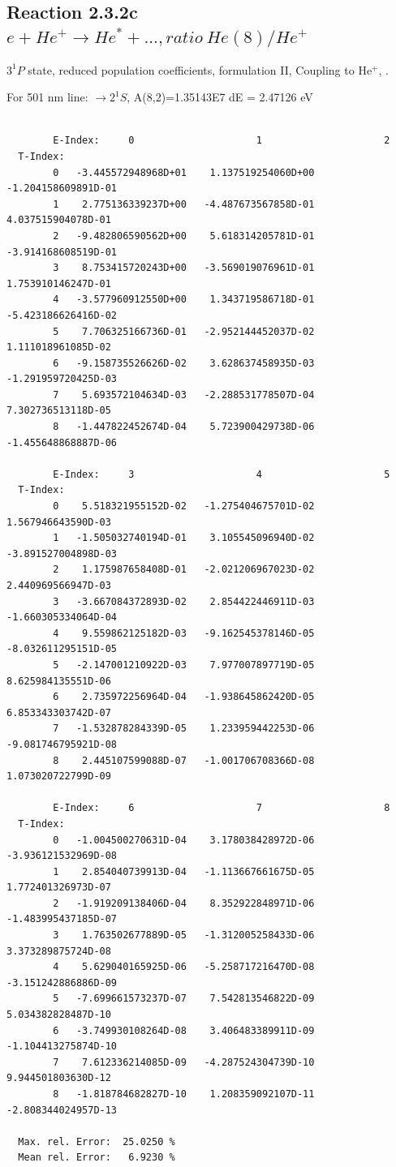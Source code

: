 \documentclass[12pt,dvips]{article}
\begin{document}
\subsection{
  Reaction 2.3.2c $e + He^+ \rightarrow He^* + ...,  ratio ~ He(8)/He^+$
}

  $3^1P$ state,
  reduced population coefficients, formulation II,
  Coupling to He$^+$, \cite{kn:Fujimoto}.

  For 501 nm line: $\rightarrow 2^1S$, A(8,2)=1.35143E7 dE = 2.47126 eV

\begin{small}\begin{verbatim}

        E-Index:     0                     1                     2
  T-Index:
        0   -3.445572948968D+01    1.137519254060D+00   -1.204158609891D-01
        1    2.775136339237D+00   -4.487673567858D-01    4.037515904078D-01
        2   -9.482806590562D+00    5.618314205781D-01   -3.914168608519D-01
        3    8.753415720243D+00   -3.569019076961D-01    1.753910146247D-01
        4   -3.577960912550D+00    1.343719586718D-01   -5.423186626416D-02
        5    7.706325166736D-01   -2.952144452037D-02    1.111018961085D-02
        6   -9.158735526626D-02    3.628637458935D-03   -1.291959720425D-03
        7    5.693572104634D-03   -2.288531778507D-04    7.302736513118D-05
        8   -1.447822452674D-04    5.723900429738D-06   -1.455648868887D-06

        E-Index:     3                     4                     5
  T-Index:
        0    5.518321955152D-02   -1.275404675701D-02    1.567946643590D-03
        1   -1.505032740194D-01    3.105545096940D-02   -3.891527004898D-03
        2    1.175987658408D-01   -2.021206967023D-02    2.440969566947D-03
        3   -3.667084372893D-02    2.854422446911D-03   -1.660305334064D-04
        4    9.559862125182D-03   -9.162545378146D-05   -8.032611295151D-05
        5   -2.147001210922D-03    7.977007897719D-05    8.625984135551D-06
        6    2.735972256964D-04   -1.938645862420D-05    6.853343303742D-07
        7   -1.532878284339D-05    1.233959442253D-06   -9.081746795921D-08
        8    2.445107599088D-07   -1.001706708366D-08    1.073020722799D-09

        E-Index:     6                     7                     8
  T-Index:
        0   -1.004500270631D-04    3.178038428972D-06   -3.936121532969D-08
        1    2.854040739913D-04   -1.113667661675D-05    1.772401326973D-07
        2   -1.919209138406D-04    8.352922848971D-06   -1.483995437185D-07
        3    1.763502677889D-05   -1.312005258433D-06    3.373289875724D-08
        4    5.629040165925D-06   -5.258717216470D-08   -3.151242886886D-09
        5   -7.699661573237D-07    7.542813546822D-09    5.034382828487D-10
        6   -3.749930108264D-08    3.406483389911D-09   -1.104413275874D-10
        7    7.612336214085D-09   -4.287524304739D-10    9.944501803630D-12
        8   -1.818784682827D-10    1.208359092107D-11   -2.808344024957D-13

  Max. rel. Error:  25.0250 %
  Mean rel. Error:   6.9230 %


\end{verbatim}\end{small}
\end{document}
